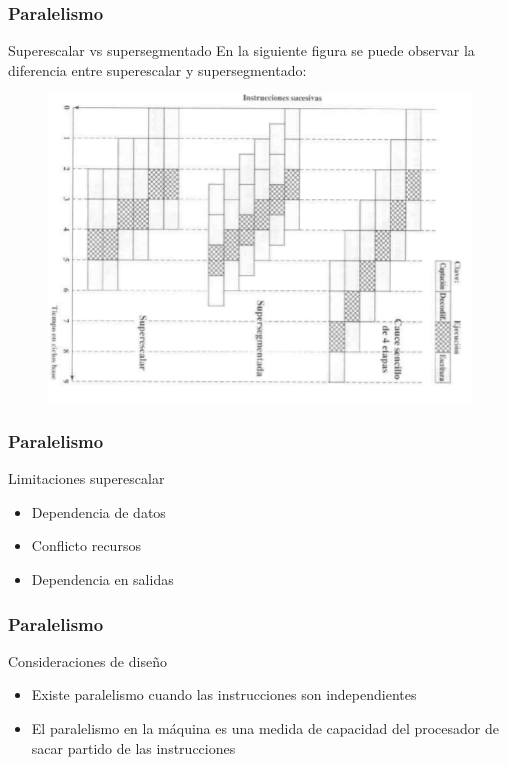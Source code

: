 \documentclass{beamer}
\begin{document}
\begin{frame}
	\frametitle{Paralelismo}
	\begin{block}{Superescalar vs supersegmentado}
	En la siguiente figura se puede observar la diferencia entre superescalar y supersegmentado:
	\end{block}	
	\begin{figure}[H]
		\centering
		\includegraphics[scale=0.4]{imagenes/supersegmentado.png} 
	\end{figure}	 		
\end{frame}

\begin{frame}
	\frametitle{Paralelismo}
	\begin{block}{Limitaciones superescalar}
	\begin{itemize}
		\item Dependencia de datos
		\item Conflicto recursos
		\item Dependencia en salidas
	\end{itemize}
	\end{block}		 		
\end{frame}

\begin{frame}
	\frametitle{Paralelismo}
	\begin{block}{Consideraciones de diseño}
	\begin{itemize}
		\item Existe paralelismo cuando las instrucciones son independientes
		\item El paralelismo en la máquina es una medida de capacidad del procesador de sacar partido de las instrucciones
	\end{itemize}
	\end{block}		 		
\end{frame}
\end{document}
